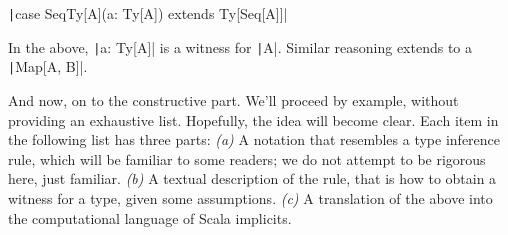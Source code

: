 \documentclass[11pt]{article}
\newcommand{\ScalaI}[1]{\texttt|#1|}
\newcommand{\FirstEtcX}[1]{\marginpar{\faCube{ \smaller #1}}\xspace}
\begin{document}
\ScalaI{case SeqTy[A](a: Ty[A]) extends Ty[Seq[A]]}

\noindent In the above, \ScalaI{a: Ty[A]} is a witness for \ScalaI{A}. 
Similar reasoning extends to a \ScalaI{Map[A, B]}.

And now, on to the constructive\FirstEtcX{2} part. We'll proceed by example, 
without providing an exhaustive list. Hopefully, the idea will become clear. 
Each item in the following list has three parts: \textit{(a)} A notation that 
resembles a type inference rule, which will be familiar to some readers; we 
do not attempt to be rigorous here, just familiar. \textit{(b)} A textual 
description of the rule, that is how to obtain a witness for a type, given 
some assumptions. \textit{(c)} A translation of the above into the 
computational language of Scala implicits.
\end{document}
